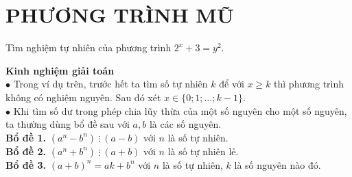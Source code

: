 
\section{PHƯƠNG TRÌNH MŨ}

\begin{vd}
Tìm nghiệm tự nhiên của phương trình $2^x+3=y^2$.
\end{vd}
\textbf{Kinh nghiệm giải toán} \\
$\bullet$ Trong ví dụ trên, trước hết ta tìm số tự nhiên $k$ để với $x \geq k$ thì phương trình không có nghiệm nguyên. Sau đó xét $x \in  \{0;1; \dots ; k-1\}$. \\
$\bullet$    Khi tìm số dư trong phép chia lũy thừa của một số nguyên cho một số nguyên, ta thường dùng bổ đề sau với $a,b$ là các số nguyên. \\ 
\textbf{Bổ đề 1.} $(a^n-b^n) ~\vdots~ (a-b)$ với $n$ là số tự nhiên.\\
\textbf{Bổ đề 2.} $(a^n+b^n) ~\vdots~ (a+b)$ với $n$ là số tự nhiên lẻ.\\
\textbf{Bổ đề 3.} $(a+b)^n=ak+b^n$ với $n$ là số tự nhiên, $k$ là số nguyên nào đó. \\
